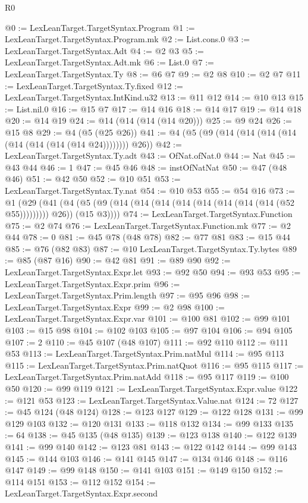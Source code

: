 \begin{lexlean}{R0}
\begin{coremodule}
@0 := LexLeanTarget.TargetSyntax.Program
@1 := LexLeanTarget.TargetSyntax.Program.mk
@2 := List.cons.{0}
@3 := LexLeanTarget.TargetSyntax.Adt
@4 := @2 @3
@5 := LexLeanTarget.TargetSyntax.Adt.mk
@6 := List.{0}
@7 := LexLeanTarget.TargetSyntax.Ty
@8 := @6 @7
@9 := @2 @8
@10 := @2 @7
@11 := LexLeanTarget.TargetSyntax.Ty.fixed
@12 := LexLeanTarget.TargetSyntax.IntKind.u32
@13 := @11 @12
@14 := @10 @13
@15 := List.nil.{0}
@16 := @15 @7
@17 := @14 @16
@18 := @14 @17
@19 := @14 @18
@20 := @14 @19
@24 := @14 (@14 (@14 (@14 @20)))
@25 := @9 @24
@26 := @15 @8
@29 := @4 (@5 (@25 @26))
@41 := @4 (@5 (@9 (@14 (@14 (@14 (@14 (@14 (@14 (@14 (@14 @24)))))))) @26))
@42 := LexLeanTarget.TargetSyntax.Ty.adt
@43 := OfNat.ofNat.{0}
@44 := Nat
@45 := @43 @44
@46 := 1
@47 := @45 @46
@48 := instOfNatNat
@50 := @47 (@48 @46)
@51 := @42 @50
@52 := @10 @51
@53 := LexLeanTarget.TargetSyntax.Ty.nat
@54 := @10 @53
@55 := @54 @16
@73 := @1
    (@29
      (@41 (@4 (@5 (@9 (@14 (@14 (@14 (@14 (@14 (@14 (@14 (@14 (@52 @55))))))))) @26)) (@15 @3))))
@74 := LexLeanTarget.TargetSyntax.Function
@75 := @2 @74
@76 := LexLeanTarget.TargetSyntax.Function.mk
@77 := @2 @44
@78 := 0
@81 := @45 @78 (@48 @78)
@82 := @77 @81
@83 := @15 @44
@85 := @76 (@82 @83)
@87 := @10 LexLeanTarget.TargetSyntax.Ty.bytes
@89 := @85 (@87 @16)
@90 := @42 @81
@91 := @89 @90
@92 := LexLeanTarget.TargetSyntax.Expr.let
@93 := @92 @50
@94 := @93 @53
@95 := LexLeanTarget.TargetSyntax.Expr.prim
@96 := LexLeanTarget.TargetSyntax.Prim.length
@97 := @95 @96
@98 := LexLeanTarget.TargetSyntax.Expr
@99 := @2 @98
@100 := LexLeanTarget.TargetSyntax.Expr.var
@101 := @100 @81
@102 := @99 @101
@103 := @15 @98
@104 := @102 @103
@105 := @97 @104
@106 := @94 @105
@107 := 2
@110 := @45 @107 (@48 @107)
@111 := @92 @110
@112 := @111 @53
@113 := LexLeanTarget.TargetSyntax.Prim.natMul
@114 := @95 @113
@115 := LexLeanTarget.TargetSyntax.Prim.natQuot
@116 := @95 @115
@117 := LexLeanTarget.TargetSyntax.Prim.natAdd
@118 := @95 @117
@119 := @100 @50
@120 := @99 @119
@121 := LexLeanTarget.TargetSyntax.Expr.value
@122 := @121 @53
@123 := LexLeanTarget.TargetSyntax.Value.nat
@124 := 72
@127 := @45 @124 (@48 @124)
@128 := @123 @127
@129 := @122 @128
@131 := @99 @129 @103
@132 := @120 @131
@133 := @118 @132
@134 := @99 @133
@135 := 64
@138 := @45 @135 (@48 @135)
@139 := @123 @138
@140 := @122 @139
@141 := @99 @140
@142 := @123 @81
@143 := @122 @142
@144 := @99 @143
@145 := @144 @103
@146 := @141 @145
@147 := @134 @146
@148 := @116 @147
@149 := @99 @148
@150 := @141 @103
@151 := @149 @150
@152 := @114 @151
@153 := @112 @152
@154 := LexLeanTarget.TargetSyntax.Expr.second

\end{coremodule}
\end{lexlean}
